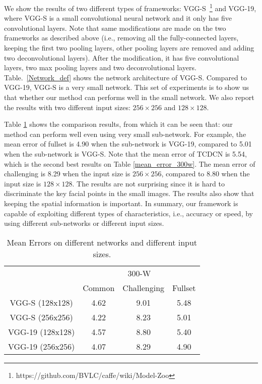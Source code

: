 \documentclass[journal]{IEEEtran}
\begin{document}
We show the results of two different types of frameworks: VGG-S~\footnote{https://github.com/BVLC/caffe/wiki/Model-Zoo} and VGG-19, where VGG-S is a small convolutional neural network and it only has five convolutional layers. Note that same modifications are made on the two frameworks as described above (i.e., removing all the fully-connected layers, keeping the first two pooling layers, other pooling layers are removed and adding two deconvolutional layers).  After the modification, it has five convolutional layers, two max pooling layers and two deconvolutional layers. Table.~\ref{Network_def} shows the network architecture of VGG-S. Compared to VGG-19, VGG-S is a very small network. This set of experiments is to show us that whether our method can performs well in the small network. We also report the results with two  different input sizes:  $256 \times 256$ and $128 \times 128$.

Table \ref{different_size} shows the comparison results, from which it can be seen that: our method can perform well even using very small sub-network. For example, the mean error of fullset is 4.90 when the sub-network is VGG-19, compared to 5.01 when the sub-network is VGG-S. Note that the mean error of TCDCN is 5.54, which is the second best results on Table \ref{mean_error_300w}. The mean error of challenging is 8.29 when the input size is $256 \times 256$, compared to 8.80 when the input size is $128 \times 128$. The results are not surprising since it is hard to discriminate the key facial points in the small images. The results also show that keeping the spatial information is important. In summary,  our framework is capable of exploiting different types of characteristics, i.e., accuracy or speed, by using different sub-networks or different input sizes.

\begin{table}[h]
\small
    \centering \caption{Mean Errors on different networks and different input sizes.}
    \begin{tabular}{c|c c c}
      \hline
 & \multicolumn{3}{|c}{300-W}\\
    & Common & Challenging & Fullset \\
        \hline
        VGG-S (128x128) & 4.62 & 9.01 & 5.48 \\
        VGG-S (256x256) & 4.22 & 8.23 & 5.01 \\
        \hline
        VGG-19 (128x128) & 4.57 & 8.80 & 5.40 \\
        VGG-19 (256x256) & 4.07 & 8.29 & 4.90\\
        \hline
        \end{tabular}
    \label{different_size}
\end{table}
\end{document}
